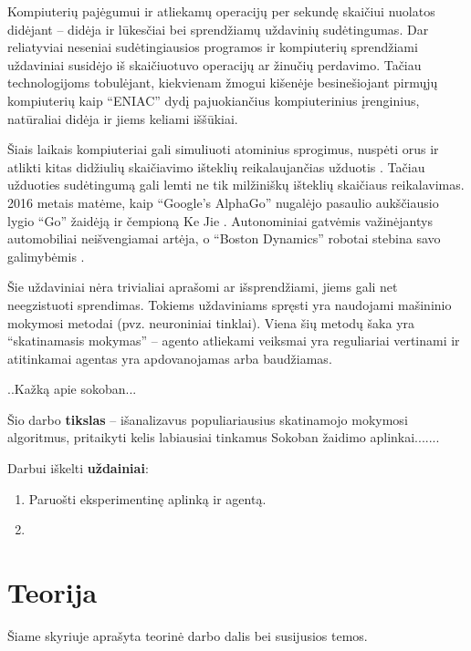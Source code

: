 \documentclass{VUMIFPSbakalaurinis}
\begin{document}
\label{sec:ivadas}
\label{subsec:problematika}
{
	Kompiuterių pajėgumui ir atliekamų operacijų per sekundę skaičiui nuolatos didėjant -- didėja ir lūkesčiai bei sprendžiamų uždavinių sudėtingumas. Dar reliatyviai neseniai sudėtingiausios programos ir kompiuterių sprendžiami uždaviniai susidėjo iš skaičiuotuvo operacijų ar žinučių perdavimo. Tačiau technologijoms tobulėjant, kiekvienam žmogui kišenėje besinešiojant pirmųjų kompiuterių kaip \enquote{ENIAC} \cite{computer_history} dydį pajuokiančius kompiuterinius įrenginius, natūraliai didėja ir jiems keliami iššūkiai.\par
	
	Šiais laikais kompiuteriai gali simuliuoti atominius sprogimus, nuspėti orus ir atlikti kitas didžiulių skaičiavimo išteklių reikalaujančias užduotis \cite{supercomputers}. Tačiau užduoties sudėtingumą gali lemti ne tik milžiniškų išteklių skaičiaus reikalavimas. 2016 metais matėme, kaip \enquote{Google’s AlphaGo} nugalėjo pasaulio aukščiausio lygio \enquote{Go} žaidėją ir čempioną Ke Jie \cite{go}. Autonominiai gatvėmis važinėjantys automobiliai neišvengiamai artėja, o \enquote{Boston Dynamics} robotai stebina savo galimybėmis \cite{bostondynamics}.\par
	
	Šie uždaviniai nėra trivialiai aprašomi ar išsprendžiami, jiems gali net neegzistuoti sprendimas. Tokiems uždaviniams spręsti yra naudojami mašininio mokymosi metodai (pvz. neuroniniai tinklai). Viena šių metodų šaka yra \enquote{skatinamasis mokymas} -- agento atliekami veiksmai yra reguliariai vertinami ir atitinkamai agentas yra apdovanojamas arba baudžiamas.
	
	..Kažką apie sokoban...
}
\label{subsec:tikslas}
{
	Šio darbo \textbf{tikslas} -- išanalizavus populiariausius skatinamojo mokymosi algoritmus, pritaikyti kelis labiausiai tinkamus Sokoban žaidimo aplinkai.......
}
\label{subsec:uzdaviniai}
{
	Darbui iškelti \textbf{uždainiai}:
	\begin{enumerate}
		\item Paruošti eksperimentinę aplinką ir agentą.
		\item
	\end{enumerate}
}
\section{Teorija}\label{sec:1}
Šiame skyriuje aprašyta teorinė darbo dalis bei susijusios temos.
\end{document}
